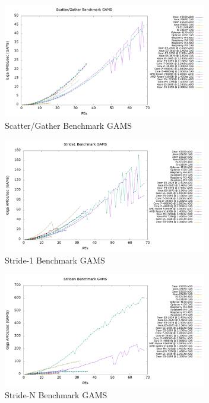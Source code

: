 \begin{figure}[!t]
\centering
\includegraphics[width=3.5in]{figures/SG_GAMS.png}
\caption{Scatter/Gather Benchmark GAMS}
\label{fig:sg_gams}
\end{figure}

\begin{figure}[!t]
\centering
\includegraphics[width=3.5in]{figures/STRIDE1_GAMS.png}
\caption{Stride-1 Benchmark GAMS}
\label{fig:s1_gams}
\end{figure}

\begin{figure}[!t]
\centering
\includegraphics[width=3.5in]{figures/STRIDEN_GAMS.png}
\caption{Stride-N Benchmark GAMS}
\label{fig:sn_gams}
\end{figure}
